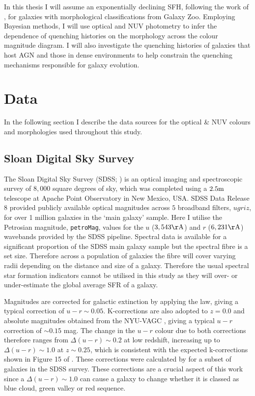 In this thesis I will assume an exponentially declining SFH, following the work of \cite{schawinski14}, for galaxies with morphological classifications from Galaxy Zoo. Employing Bayesian methods, I will use optical and NUV photometry to infer the dependence of quenching histories on the morphology across the colour magnitude diagram. I will also investigate the quenching histories of galaxies that host AGN and those in dense environments to help constrain the quenching mechanisms responsible for galaxy evolution.

\section{Data}\label{sec:data}

In the following section I describe the data sources for the optical \& NUV colours and morphologies used throughout this study.

\subsection{Sloan Digital Sky Survey}\label{sec:sdssintro}

The Sloan Digital Sky Survey (SDSS; \citealt{york00}) is an optical imaging and spectroscopic survey of $8,000$ square degrees of sky, which was completed using a $2.5\rm{m}$ telescope at Apache Point Observatory in New Mexico, USA. SDSS Data Release 8 \citep{aihara11} provided publicly available optical magnitudes across $5$ broadband filters, $ugriz$, for over 1 million galaxies in the `main galaxy' sample. Here I utilise the Petrosian magnitude, {\tt petroMag}, values for the $u$ ($3,543\rm{\AA}$) and $r$ ($6,231\rm{\AA}$) wavebands provided by the SDSS pipeline. Spectral data is available for a significant proportion of the SDSS main galaxy sample but the spectral fibre is a set size. Therefore across a population of galaxies the fibre will cover varying radii depending on the distance and size of a galaxy. Therefore the usual spectral star formation indicators cannot be utilised in this study as they will over- or under-estimate the global average SFR of a galaxy. 

Magnitudes are corrected for galactic extinction \citep{Oh11} by applying the \citet{Cardelli89} law, giving a typical correction of $u-r \sim 0.05$. K-corrections are also adopted to $z=0.0$ and absolute magnitudes obtained from the NYU-VAGC \citep{Blanton05, padmanabhan08, blanton07}, giving a typical $u-r$ correction of $\sim 0.15$ mag. The change in the $u-r$ colour due to both corrections therefore ranges from $\Delta (u-r) \sim 0.2$ at low redshift, increasing up to $\Delta (u-r) \sim 1.0$ at $z \sim 0.25$, which is consistent with the expected k-corrections shown in Figure 15 of \citet{blanton07}. These corrections were calculated by \citet{Bamford09} for a subset of galaxies in the SDSS survey. These corrections are a crucial aspect of this work since a $\Delta (u-r) \sim 1.0$ can cause a galaxy to change whether it is classed as blue cloud, green valley or red sequence.

